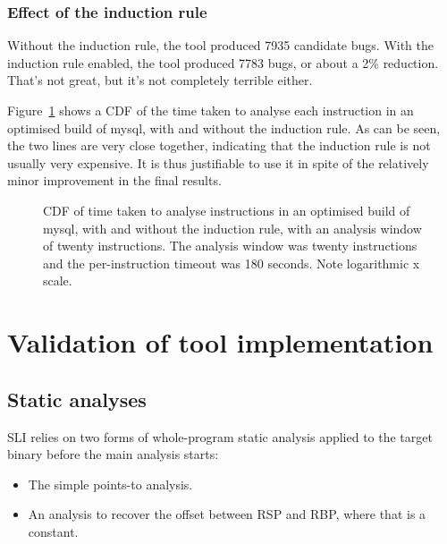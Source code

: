 

\subsubsection{Effect of the induction rule}

Without the induction rule, the tool produced 7935 candidate bugs.
With the induction rule enabled, the tool produced 7783 bugs, or about
a 2\% reduction.  That's not great, but it's not completely terrible
either.

Figure~\ref{fig:eval:mysql:analysis_cdf} shows a CDF of the time taken
to analyse each instruction in an optimised build of mysql, with and
without the induction rule.  As can be seen, the two lines are very
close together, indicating that the induction rule is not usually very
expensive.  It is thus justifiable to use it in spite of the
relatively minor improvement in the final results.

\begin{figure}

\caption{CDF of time taken to analyse instructions in an optimised
  build of mysql, with and without the induction rule, with an
  analysis window of twenty instructions.  The analysis window was
  twenty instructions and the per-instruction timeout was 180 seconds.
  Note logarithmic x scale.} 
\label{fig:eval:mysql:analysis_cdf}
\end{figure}
  
\section{Validation of tool implementation}

\subsection{Static analyses}

SLI relies on two forms of whole-program static analysis applied to
the target binary before the main analysis starts:

\begin{itemize}
\item
  The simple points-to analysis.
\item
  An analysis to recover the offset between RSP and RBP, where that is a constant.
\end{itemize}

